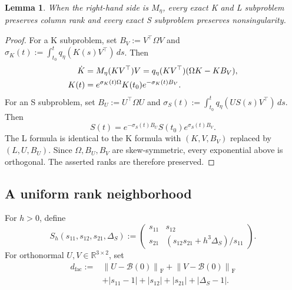 \documentclass[10pt,a4paper]{amsart}
\numberwithin{equation}{section}
\newtheorem{lemma}[theorem]{Lemma}
\newcommand{\F}{\mathrm F}
\newcommand{\norm}[1]{\left\lVert #1\right\rVert}
\begin{document}
\begin{lemma}\label{lem:post-switch-rank}
When the right-hand side is $M_\eta$, every exact K and L subproblem
preserves column rank and every exact S subproblem preserves
nonsingularity.
\end{lemma}

\begin{proof}
For a K subproblem, set
\(B_V:=V^\top\Omega V\) and
\(\sigma_K(t):=\int_{t_0}^tq_\eta(K(s)V^\top)\,ds\).  Then
\begin{align}
 \dot K
 &=M_\eta(KV^\top)V
 =q_\eta(KV^\top)(\Omega K-KB_V),
 \label{eq:post-reduction-k}\\
 K(t)&=e^{\sigma_K(t)\Omega}K(t_0)e^{-\sigma_K(t)B_V}.
 \notag
\end{align}
For an S subproblem, set \(B_U:=U^\top\Omega U\) and
\(\sigma_S(t):=\int_{t_0}^tq_\eta(US(s)V^\top)\,ds\).  Then
\begin{equation}\label{eq:post-reduction-s}
 S(t)=e^{-\sigma_S(t)B_U}S(t_0)e^{\sigma_S(t)B_V}.
\end{equation}
The L formula is identical to the K formula with
\((K,V,B_V)\) replaced by \((L,U,B_U)\).  Since
\(\Omega,B_U,B_V\) are skew-symmetric, every exponential above is
orthogonal.  The asserted ranks are therefore preserved.
\end{proof}

\subsection{A uniform rank neighborhood}
\label{app:uniform-neighborhood}

For \(h>0\), define
\begin{equation}\label{eq:appendix-block-start-chart}
 S_h(s_{11},s_{12},s_{21},\Delta_S):=
 \begin{pmatrix}
 s_{11}&s_{12}\\
 s_{21}&(s_{12}s_{21}+h^3\Delta_S)/s_{11}
 \end{pmatrix}.
\end{equation}
For orthonormal \(U,V\in\mathbb R^{3\times2}\), set
\begin{equation}\label{eq:appendix-fixed-neighborhood}
\begin{aligned}
 d_{\mathrm{fac}}:={}&\norm{U-\mathcal B(0)}_{\F}
 +\norm{V-\mathcal B(0)}_{\F}\\
 &+|s_{11}-1|+|s_{12}|+|s_{21}|+|\Delta_S-1|.
\end{aligned}
\end{equation}
\end{document}
